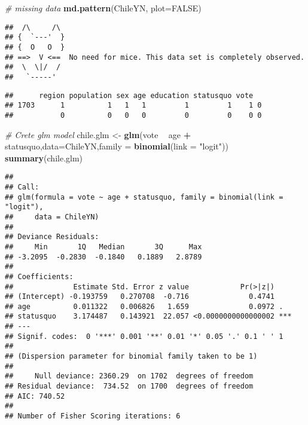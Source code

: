 \documentclass[]{article}
\newenvironment{Shaded}{\begin{snugshade}}{\end{snugshade}}
\newcommand{\CommentTok}[1]{\textcolor[rgb]{0.56,0.35,0.01}{\textit{#1}}}
\newcommand{\DataTypeTok}[1]{\textcolor[rgb]{0.13,0.29,0.53}{#1}}
\newcommand{\KeywordTok}[1]{\textcolor[rgb]{0.13,0.29,0.53}{\textbf{#1}}}
\newcommand{\NormalTok}[1]{#1}
\newcommand{\OperatorTok}[1]{\textcolor[rgb]{0.81,0.36,0.00}{\textbf{#1}}}
\newcommand{\OtherTok}[1]{\textcolor[rgb]{0.56,0.35,0.01}{#1}}
\newcommand{\StringTok}[1]{\textcolor[rgb]{0.31,0.60,0.02}{#1}}
\begin{document}
\begin{Shaded}
\begin{Highlighting}[]
\CommentTok{# missing data }
\KeywordTok{md.pattern}\NormalTok{(ChileYN, }\DataTypeTok{plot=}\OtherTok{FALSE}\NormalTok{)}
\end{Highlighting}
\end{Shaded}

\begin{verbatim}
##  /\     /\
## {  `---'  }
## {  O   O  }
## ==>  V <==  No need for mice. This data set is completely observed.
##  \  \|/  /
##   `-----'
\end{verbatim}

\begin{verbatim}
##      region population sex age education statusquo vote  
## 1703      1          1   1   1         1         1    1 0
##           0          0   0   0         0         0    0 0
\end{verbatim}

\begin{Shaded}
\begin{Highlighting}[]
\CommentTok{# Crete glm model}
\NormalTok{chile.glm <-}\StringTok{ }\KeywordTok{glm}\NormalTok{(vote }\OperatorTok{~}\StringTok{ }\NormalTok{age }\OperatorTok{+}\StringTok{ }\NormalTok{statusquo,}\DataTypeTok{data=}\NormalTok{ChileYN,}\DataTypeTok{family =} \KeywordTok{binomial}\NormalTok{(}\DataTypeTok{link =} \StringTok{"logit"}\NormalTok{)) }
\KeywordTok{summary}\NormalTok{(chile.glm)}
\end{Highlighting}
\end{Shaded}

\begin{verbatim}
## 
## Call:
## glm(formula = vote ~ age + statusquo, family = binomial(link = "logit"), 
##     data = ChileYN)
## 
## Deviance Residuals: 
##     Min       1Q   Median       3Q      Max  
## -3.2095  -0.2830  -0.1840   0.1889   2.8789  
## 
## Coefficients:
##              Estimate Std. Error z value            Pr(>|z|)    
## (Intercept) -0.193759   0.270708  -0.716              0.4741    
## age          0.011322   0.006826   1.659              0.0972 .  
## statusquo    3.174487   0.143921  22.057 <0.0000000000000002 ***
## ---
## Signif. codes:  0 '***' 0.001 '**' 0.01 '*' 0.05 '.' 0.1 ' ' 1
## 
## (Dispersion parameter for binomial family taken to be 1)
## 
##     Null deviance: 2360.29  on 1702  degrees of freedom
## Residual deviance:  734.52  on 1700  degrees of freedom
## AIC: 740.52
## 
## Number of Fisher Scoring iterations: 6
\end{verbatim}
\end{document}
